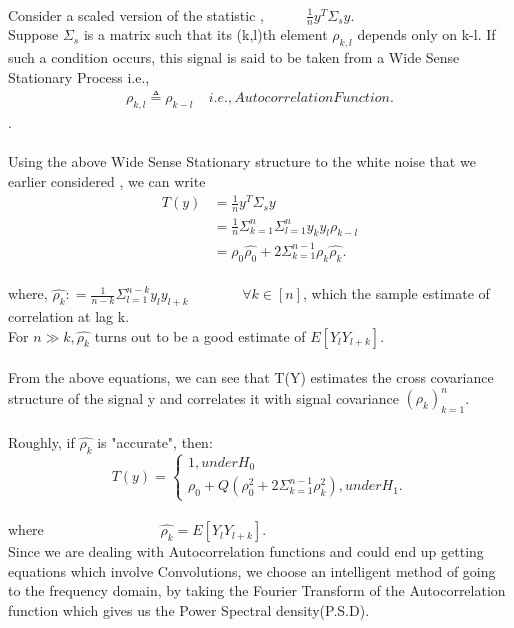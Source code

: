 \documentclass[a4paper,english,12pt]{article}
\begin{document}
\\Consider a scaled version of the statistic ,\ \ \ \ \ \ $\frac{1}{n}y^T\Sigma_sy$.\\
Suppose $\Sigma_s$ is a matrix such that its (k,l)th element $\rho_{k,l}$ depends only on k-l. If such a condition occurs, this signal is said to be taken from a Wide Sense Stationary Process i.e., 
\begin{align*}
\rho_{k,l} \triangleq \rho_{k-l} \ \ \ \ \  i.e., Autocorrelation Function.
\end{align*}.\\
\\Using the above Wide Sense Stationary structure to the white noise that we earlier considered , we can write
\begin{equation*}
\begin{aligned}
T(y)&=\frac{1}{n}y^T\Sigma_sy \\
&=\frac{1}{n}\Sigma_{k=1}^{n}\Sigma_{l=1}^{n}y_ky_l\rho_{k-l} \\
&=\rho_0\hat{\rho_0} + 2\Sigma_{k=1}^{n-1}\rho_k\hat{\rho_k}.
\end{aligned}
\end{equation*}\\
where, $\hat{\rho_k}\colon=\frac{1}{n-k}\Sigma_{l=1}^{n-k}y_ly_{l+k}$ \ \ \ \ \ \ \ $\forall k \in [n]$, which the sample estimate of correlation at lag k.\\
For $n\gg k, \hat{\rho_k}$ turns out to be a good estimate of $E[Y_l Y_{l+k}]$.\\
\\From the above equations, we can see that T(Y) estimates the cross covariance structure of the signal y and correlates it with signal covariance $(\rho_k)_{k=1}^{n}$.\\
\\Roughly, if $\hat{\rho_k}$ is "accurate", then:\\
\begin{equation*}
T(y)=
\begin{cases}
 1 , under H_0\\
 \rho_0+Q(\rho_0^2+2\Sigma_{k=1}^{n-1}\rho_k^2), under H_1.
\end{cases}
\end{equation*}\\
where \ \ \ \ \ \ \ \ \ \ \ \ \ \ \ \  $\hat{\rho_k}= E[Y_l Y_{l+k}]$.\\
Since we are dealing with Autocorrelation functions and could end up getting equations which involve Convolutions, we choose an intelligent method of going to the frequency domain, by taking the Fourier Transform of the Autocorrelation function which gives us the Power Spectral density(P.S.D).\\
\end{document}
